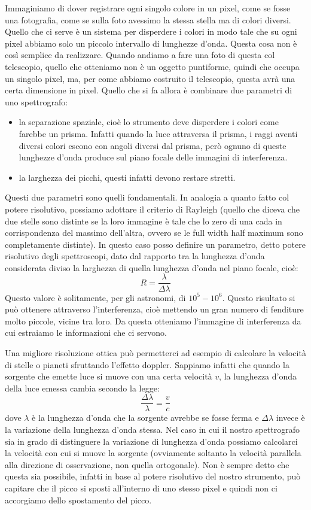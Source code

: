 \documentclass[a4paper,11pt]{article}
\begin{document}
        Immaginiamo di dover registrare ogni singolo colore in un pixel, come se fosse una fotografia, come se sulla foto avessimo la stessa stella ma di colori diversi. Quello che ci serve è un sistema per disperdere i colori in modo tale che su ogni pixel abbiamo solo un piccolo intervallo di lunghezze d'onda. Questa cosa non è così semplice da realizzare. Quando andiamo a fare una foto di questa col telescopio, quello che otteniamo non è un oggetto puntiforme, quindi che occupa un singolo pixel, ma, per come abbiamo costruito il telescopio, questa avrà una certa dimensione in pixel. Quello che si fa allora è combinare due parametri di uno spettrografo:
        \begin{itemize}
            \item la separazione spaziale, cioè lo strumento deve disperdere i colori come farebbe un prisma. Infatti quando la luce attraversa il prisma, i raggi aventi diversi colori escono con angoli diversi dal prisma, però ognuno di queste lunghezze d'onda produce sul piano focale delle immagini di interferenza.
            \item la larghezza dei picchi, questi infatti devono restare stretti.
        \end{itemize}
        Questi due parametri sono quelli fondamentali. In analogia a quanto fatto col potere risolutivo, possiamo adottare il criterio di Rayleigh (quello che diceva che due stelle sono distinte se la loro immagine è tale che lo zero di una cada in corrispondenza del massimo dell'altra, ovvero se le full width half maximum sono completamente distinte). In questo caso posso definire un parametro, detto potere risolutivo degli spettroscopi, dato dal rapporto tra la lunghezza d'onda considerata diviso la larghezza di quella lunghezza d'onda nel piano focale, cioè:
        $$
            R= \frac{\lambda}{\Delta \lambda}  
        $$
        Questo valore è solitamente, per gli astronomi, di $10^5 - 10^6$. Questo risultato si può ottenere attraverso l'interferenza, cioè mettendo un gran numero di fenditure molto piccole, vicine tra loro. Da questa otteniamo l'immagine di interferenza da cui estraiamo le informazioni che ci servono. 
        
        Una migliore risoluzione ottica può permetterci ad esempio di calcolare la velocità di stelle o pianeti sfruttando l'effetto doppler. Sappiamo infatti che quando la sorgente che emette luce si muove con una certa velocità $v$, la lunghezza d'onda della luce emessa cambia secondo la legge:
        $$
            \frac{\Delta \lambda}{\lambda} = \frac{v}{c}
        $$
        dove $\lambda$ è la lunghezza d'onda che la sorgente avrebbe se fosse ferma e $\Delta \lambda$ invece è la variazione della lunghezza d'onda stessa. Nel caso in cui il nostro spettrografo sia in grado di distinguere la variazione di lunghezza d'onda possiamo calcolarci la velocità con cui si muove la sorgente (ovviamente soltanto la velocità parallela alla direzione di osservazione, non quella ortogonale). Non è sempre detto che questa sia possibile, infatti in base al potere risolutivo del nostro strumento, può capitare che il picco si sposti all'interno di uno stesso pixel e quindi non ci accorgiamo dello spostamento del picco. 
        
\end{document}
